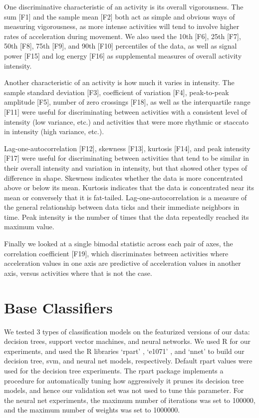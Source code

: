 
One discriminative characteristic of an activity is its overall vigorousness.
The sum [F1] and the sample mean [F2] both act as simple and obvious ways
of measuring vigorousness, as more intense activities will tend to involve
higher rates of acceleration during movement. We also used the 10th [F6], 25th [F7],
50th [F8], 75th [F9], and 90th [F10] percentiles of the data, as well as signal
power [F15] and log energy [F16] as supplemental measures of overall activity intensity.

Another characteristic of an activity is how much it varies in intensity. The sample standard
deviation [F3], coefficient of variation [F4], peak-to-peak amplitude [F5],
number of zero crossings [F18], as well as the
interquartile range [F11] were useful for discriminating between activities
with a consistent level of intensity (low variance, etc.) and activities that were more
rhythmic or staccato in intensity (high variance, etc.). 

Lag-one-autocorrelation [F12], skewness [F13], kurtosis [F14], and peak intensity [F17]
were useful for discriminating between
activities that tend to be similar in their overall intensity and variation in intensity,
but that showed other types of difference in shape. Skewness indicates whether the data is
more concentrated above or below its mean. Kurtosis indicates that the data is concentrated
near its mean or conversely that it is fat-tailed. Lag-one-autocorrelation is a measure of
the general relationship between data ticks and their immediate neighbors in time. Peak
intensity is the number of times that the data repeatedly reached its maximum value. 

Finally we looked at a single bimodal statistic across each pair of axes, the correlation
coefficient [F19], which discriminates between activities where acceleration values in one axis
are predictive of acceleration values in another axis, versus activities where that is not the case.

\section{Base Classifiers}

We tested 3 types of classification models on the featurized versions of our data:
decision trees, support vector machines, and neural networks. We used R for our
experiments, and used the R libraries `rpart' \cite{rpart}, `e1071' \cite{svm},
and `nnet' \cite{nnet} to build
our decision tree, svm, and neural net models, respectively. Default rpart values
were used for the decision tree experiments. The rpart package implements a
procedure for automatically tuning how aggressively it prunes its decision tree
models, and hence our validation set was not used to tune this parameter. 
For the neural net experiments, 
the maximum number of iterations was set to 100000, and the maximum number of
weights was set to 1000000.

